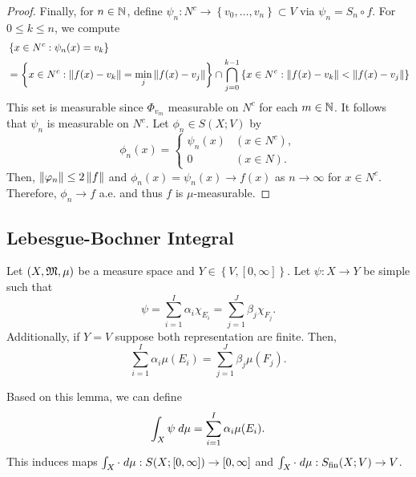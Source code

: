 \documentclass[a4paper]{article}
\begin{document}
\begin{proof}
  Finally, for $n \in \mathbb{N}$, define $\psi_n: N^c 
  \to \left\{ v_0, \dots, v_n \right\} \subset V$
  via $\psi_n = S_n \circ f$. 
  For $0 \leq k \leq n$, we compute 
  \[
  \begin{aligned}
    &
    \left\{ x \in N^c: \psi_n(x) = v_k \right\} \\
    &= \left\{ x \in N^c: 
    \left\lVert f(x) - v_k\right\rVert = \min_j \left\lVert f(x) - v_j\right\rVert \right\}
    \cap \bigcap_{j=0}^{k-1} 
    \left\{ x \in N^c: 
    \left\lVert f(x) - v_k\right\rVert < \left\lVert f(x) - v_j\right\rVert \right\}
  \end{aligned}
  \]
  This set is measurable since $\Phi_{v_m}$ measurable 
  on $N^c$ for each $m \in \mathbb{N}$. 
  It follows that $\psi_n$ is measurable on $N^c$.
  Let $\phi_n \in S(X; V)$ by 
  \[
  \phi_n(x) = \begin{cases}
    \psi_n(x) & (x \in N^c), \\
    0 & (x \in N).
  \end{cases}
  \]
  Then, $\left\lVert \varphi_n\right\rVert \leq 2\left\lVert f\right\rVert$ 
  and $\phi_n(x) = \psi_n(x) \to f(x)$ as 
  $n \to \infty$ for $x \in N^c$. 
  Therefore, $\phi_n \to f$ a.e. and thus 
  $f$ is $\mu$-measurable.

\end{proof}

\subsection{Lebesgue-Bochner Integral}

\begin{lemma}
  Let $(X, \mathfrak{M}, \mu)$ be a measure space and 
  $Y \in \left\{ V, [0, \infty] \right\}$. 
  Let $\psi: X \to Y$ be simple such that 
  \[
  \psi = \sum_{i=1}^I \alpha_i \chi_{E_i} 
  = \sum_{j=1}^J \beta_j \chi_{F_j}.
  \]
  Additionally, if $Y = V$ suppose both representation
  are finite. Then, 
  \[
  \sum_{i=1}^I \alpha_i \mu(E_i) = \sum_{j=1}^J 
  \beta_j \mu(F_j).
  \]

  Based on this lemma, we can define
  \[
  \int_X \psi \; d\mu = \sum_{i=1}^I \alpha_i \mu(E_i).
  \]
  This induces maps $\int_X \cdot \; d \mu: S(X; [0, 
  \infty]) \to [0, \infty]$ and $\int_X \cdot \; d \mu 
  : S_{\text{fin}}(X; V) \to V$.
\end{lemma}
\end{document}
